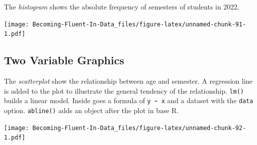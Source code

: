 \documentclass[
]{book}
\newenvironment{Shaded}{\begin{snugshade}}{\end{snugshade}}
\newcommand{\AttributeTok}[1]{\textcolor[rgb]{0.77,0.63,0.00}{#1}}
\newcommand{\DecValTok}[1]{\textcolor[rgb]{0.00,0.00,0.81}{#1}}
\newcommand{\FloatTok}[1]{\textcolor[rgb]{0.00,0.00,0.81}{#1}}
\newcommand{\FunctionTok}[1]{\textcolor[rgb]{0.00,0.00,0.00}{#1}}
\newcommand{\NormalTok}[1]{#1}
\newcommand{\OtherTok}[1]{\textcolor[rgb]{0.56,0.35,0.01}{#1}}
\newcommand{\SpecialCharTok}[1]{\textcolor[rgb]{0.00,0.00,0.00}{#1}}
\newcommand{\StringTok}[1]{\textcolor[rgb]{0.31,0.60,0.02}{#1}}
\begin{document}
The \emph{histogram} shows the absolute frequency of semesters of students in 2022.

\begin{Shaded}
\end{Shaded}

\texttt{[image: Becoming-Fluent-In-Data\_files/figure-latex/unnamed-chunk-91-1.pdf]}

\hypertarget{two-variable-graphics}{%
\subsection{Two Variable Graphics}\label{two-variable-graphics}}

The \emph{scatterplot} show the relationship between age and semester. A regression line is added to the plot to illustrate the general tendency of the relationship. \texttt{lm()} builds a linear model. Inside goes a formula of \texttt{y\ \textasciitilde{}\ x} and a dataset with the \texttt{data} option. \texttt{abline()} adds an object after the plot in base R.

\begin{Shaded}
\end{Shaded}

\texttt{[image: Becoming-Fluent-In-Data\_files/figure-latex/unnamed-chunk-92-1.pdf]}
\end{document}
